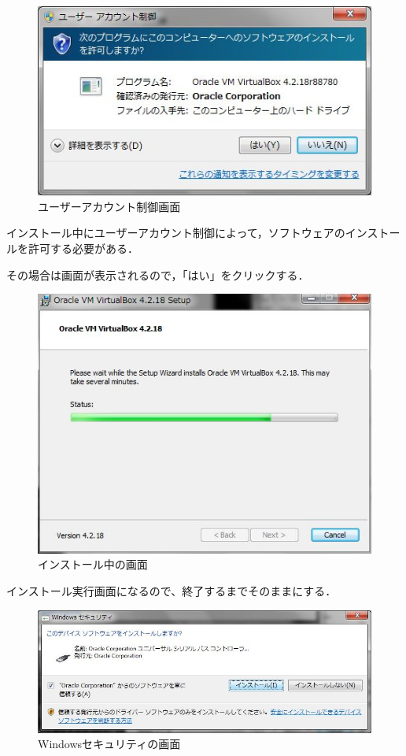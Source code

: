 \begin{figure}[H]
\centering
\includegraphics[width=13cm]{useracount.jpg}
\caption{ユーザーアカウント制御画面}\label{サンプル図}
\end{figure}

インストール中にユーザーアカウント制御によって，ソフトウェアのインストールを許可する必要がある．

その場合は画面が表示されるので，「はい」をクリックする．


\begin{figure}[H]
\centering
\includegraphics[width=13cm]{It_is_install.jpg}
\caption{インストール中の画面}\label{サンプル図}
\end{figure}

インストール実行画面になるので、終了するまでそのままにする．

\begin{figure}[H]
\centering
\includegraphics[width=13cm]{device_install.jpg}
\caption{Windowsセキュリティの画面}\label{サンプル図}
\end{figure}

